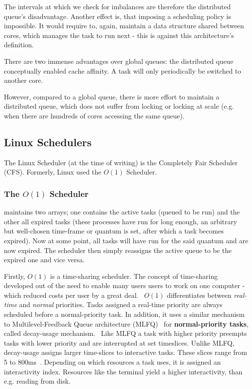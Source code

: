 \documentclass[runningheads]{llncs}
\begin{document}
The intervals at which we check for imbalances are therefore the distributed queue's disadvantage. Another effect is, that imposing a scheduling policy is impossible. It would require to, again, maintain a data structure shared between cores, which manages the task to run next - this is against this architecture's definition.

There are two immense advantages over global queues: the distributed queue conceptually enabled cache affinity. A task will only periodically be switched to another core.

However, compared to a global queue, there is more effort to maintain a distributed queue, which does not suffer from locking or locking at scale (e.g. when there are hundreds of cores accessing the same queue).~\cite{ostep,meehean}

\subsection{Linux Schedulers}
The Linux Scheduler (at the time of writing) is the Completely Fair Scheduler (CFS). Formerly, Linux used the $O(1)$ Scheduler. 

\subsubsection{The $O(1)$ Scheduler}

maintains two arrays; one contains the active tasks (queued to be run) and the other all expired tasks (these processes have run for long enough, an arbitrary but well-chosen time-frame or quantum is set, after which a task becomes expired). Now at some point, all tasks will have run for the said quantum and are now expired. The scheduler then simply reassigns the active queue to be the expired one and vice versa.~\cite{linux-journal-cfs,ostep,meehean} 

Firstly, $O(1)$ is a time-sharing scheduler. The concept of time-sharing developed out of the need to enable many users users to work on one computer - which reduced costs per user by a great deal.~\cite{wikipedia-timesharing-history} 
$O(1)$ differentiates between \textit{real-time} and \textit{normal} priorities. Tasks assigned a real-time priority are always scheduled before a normal-priority task. In addition, it uses a similar mechanism to Multilevel-Feedback Queue architecture (MLFQ)~\cite{ostep} for \textbf{normal-priority tasks}, called decay-usage mechanism.~\cite{epema} Like MLFQ a task with higher priority preempts tasks with lower priority and are interrupted at set timeslices. Unlike MLFQ, decay-usage assigns larger time-slices to interactive tasks. These slices range from 5 to 800ms~\cite{meehean}. Depending on which resources a task uses, it is assigned an interactivity index. Resources like the terminal yield a higher interactivity, than e.g. reading from disk.
\end{document}
